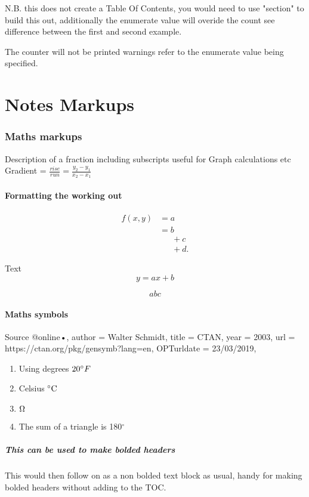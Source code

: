 \documentclass[fleqn]{report}
\begin{document}
N.B. this does not create a Table Of Contents, you would need to use "section" to build this out, additionally the enumerate value will overide the count see difference between the first and second example. 
\vspace{\baselineskip}

The counter will not be printed warnings refer to the enumerate value being specified.
\clearpage

\chapter{Notes Markups}

\subsection{Maths markups}
Description of a fraction including subscripts useful for Graph calculations etc
Gradient = {\Large $\frac{rise}{run} = \frac{y_2-y_1}{x_2-x_1}$}

\subsubsection{Formatting the working out}
\begin{equation}
\begin{split}
	f(x,y) & =a\\
       & = b \\[1ex]
       &\phantom{=}\, +c \\[2ex]
       &\phantom{=}\, +d.
\end{split}
\end{equation}

\noindent Text %
\begin{equation*} 
	y = ax + b
\end{equation*}

$$ abc $$

\subsubsection{Maths symbols}
Source @online{•,
author = {Wal­ter Sch­midt},
title = {CTAN},
year = {2003},
url = {https://ctan.org/pkg/gensymb?lang=en},
OPTurldate = {23/03/2019},
}


\begin{enumerate}
	\item Using degrees $20 \degree F$
	\item Celsius $ \celsius $
	\item $\ohm$
	\item The sum of a triangle is 180$^{\circ}$
\end{enumerate}

\paragraph{This can be used to make bolded headers} \mbox{} %

This would then follow on as a non bolded text block as usual, handy for making bolded headers without adding to the TOC.
\end{document}
